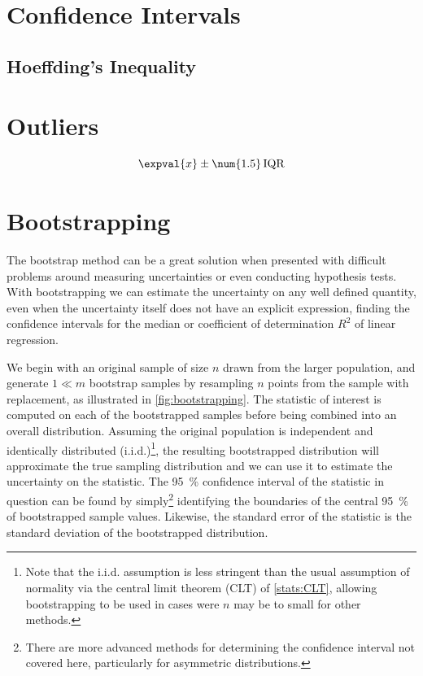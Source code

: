 \section{Confidence Intervals}
\label{stats:CI}

\subsection{Hoeffding's Inequality}
\label{stats:CI:hoeffding}

\section{Outliers}
\label{stats:outliers}

\begin{equation}\label{eq:stats:outlier_IQR_def}
\expval{x} \pm \num{1.5}\, \text{IQR}
\end{equation}

\section{Bootstrapping}
\label{stats:bootstrapping}

The bootstrap method can be a great solution when presented with difficult problems
around measuring uncertainties or even conducting hypothesis tests.
With bootstrapping we can estimate the uncertainty on any well defined quantity,
even when the uncertainty itself does not have an explicit expression,
\eg finding the confidence intervals for the median
or coefficient of determination $R^{2}$ of linear regression.

We begin with an original sample of size $n$ drawn from the larger population,
and generate $1 \ll m$ bootstrap samples by resampling $n$ points from the sample with replacement,
as illustrated in \cref{fig:bootstrapping}.
The statistic of interest is computed on each of the bootstrapped samples
before being combined into an overall distribution.
Assuming the original population is independent and identically distributed (i.i.d.)\footnote{Note
that the i.i.d. assumption is less stringent than
the usual assumption of normality via the central limit theorem (CLT) of \cref{stats:CLT},
allowing bootstrapping to be used in cases were $n$ may be to small for other methods.},
the resulting bootstrapped distribution will approximate the true sampling distribution
and we can use it to estimate the uncertainty on the statistic.
The \SI{95}{\percent} confidence interval of the statistic in question
can be found by simply\footnote{There are
more advanced methods for determining the confidence interval not covered here,
particularly for asymmetric distributions.} identifying
the boundaries of the central \SI{95}{\percent} of bootstrapped sample values.
Likewise, the standard error of the statistic is the standard deviation of the bootstrapped distribution.


